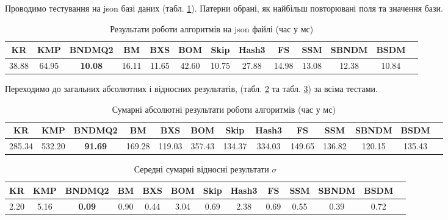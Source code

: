\documentclass[a4paper,14pt]{extarticle} %
\begin{document}
				Проводимо тестування на json базі даних (табл. \ref{table:uniqueJson}). Патерни обрані, як найбільш повторювані поля та значення бази.
				\begin{table}[H]
					\centering
					\scriptsize
					\begin{tabular}{|c|c|c|c|c|c|c|c|c|c|c|c|c|}
					\hline
					\textbf{KR} & \textbf{KMP} & \textbf{BNDMQ2} & \textbf{BM} & \textbf{BXS} & \textbf{BOM} & \textbf{Skip} & \textbf{Hash3} & \textbf{FS} & \textbf{SSM} & \textbf{SBNDM} & \textbf{BSDM} \\
					\hline
					38.88 & 64.95 & \textbf{10.08} & 16.11 & 11.65 & 42.60 & 10.75 & 27.88 & 14.98 & 13.08 & 12.38 & 10.84 \\
					\hline
					\end{tabular}
					\caption{Результати роботи алгоритмів на json файлі (час у мс)}
					\label{table:uniqueJson}
				\end{table}
					
				Переходимо до загальних абсолютних і відносних результатів, (табл. \ref{table:uniqueAbsolute} та табл. \ref{table:uniqueRelative}) за всіма тестами.

				\begin{table}[H]
					\centering
					\scriptsize
					\begin{tabular}{|c|c|c|c|c|c|c|c|c|c|c|c|c|}
					\hline
					\textbf{KR} & \textbf{KMP} & \textbf{BNDMQ2} & \textbf{BM} & \textbf{BXS} & \textbf{BOM} & \textbf{Skip} & \textbf{Hash3} & \textbf{FS} & \textbf{SSM} & \textbf{SBNDM} & \textbf{BSDM} \\
					\hline
					285.34 & 532.20 & \textbf{91.69} & 169.28 & 119.03 & 357.43 & 134.37 & 334.03 & 149.65 & 136.82 & 120.15 & 135.43 \\
					\hline
					\end{tabular}
					\caption{Сумарні абсолютні результати роботи алгоритмів (час у мс)}
					\label{table:uniqueAbsolute}
				\end{table}
				
				\begin{table}[H]
					\centering
					\scriptsize
					\begin{tabular}{|c|c|c|c|c|c|c|c|c|c|c|c|c|}
					\hline
					\textbf{KR} & \textbf{KMP} & \textbf{BNDMQ2} & \textbf{BM} & \textbf{BXS} & \textbf{BOM} & \textbf{Skip} & \textbf{Hash3} & \textbf{FS} & \textbf{SSM} & \textbf{SBNDM} & \textbf{BSDM} \\
					\hline
					2.20 & 5.16 & \textbf{0.09} & 0.90 & 0.44 & 3.04 & 0.69 & 2.38 & 0.69 & 0.55 & 0.39 & 0.72 \\
					\hline
					\end{tabular}
					\caption{Середні сумарні відносні результати $\sigma$}
					\label{table:uniqueRelative}
				\end{table}
\end{document}
